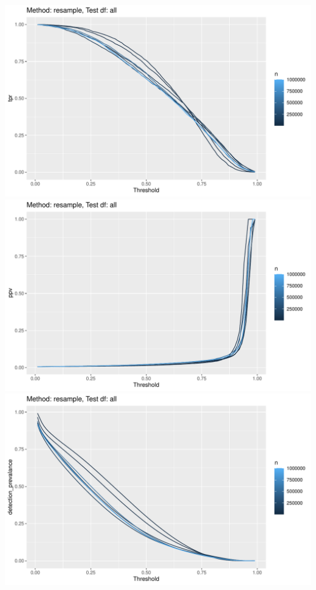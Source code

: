 \documentclass[12pt]{article}
\begin{document}
\pagebreak
\begin{center}
\includegraphics[width=.7\textwidth]{size_resample_all_tpr.pdf}
\includegraphics[width=.7\textwidth]{size_resample_all_ppv.pdf}
\includegraphics[width=.7\textwidth]{size_resample_all_detection_prevalance.pdf}
\end{center}
\end{document}
